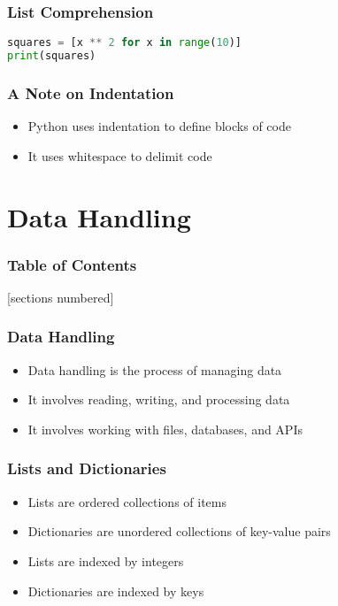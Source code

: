 \documentclass[serif, 9pt, aspectratio=32]{beamer}
\begin{document}
\begin{frame}[fragile]
    \frametitle{List Comprehension}
    \begin{lstlisting}[language=Python]
squares = [x ** 2 for x in range(10)]
print(squares)
    \end{lstlisting}
\end{frame}

\begin{frame}
    \centering
    \frametitle{A Note on Indentation}
    \begin{itemize}
        \setlength{\itemsep}{2em}
        \item Python uses indentation to define blocks of code
        \item It uses whitespace to delimit code
    \end{itemize}
\end{frame}

\section{Data Handling}

\begin{frame}
    \frametitle{Table of Contents}
    [sections numbered]
    \tableofcontents[currentsection]
\end{frame}

\begin{frame}
    \centering
    \frametitle{Data Handling}
    \begin{itemize}
        \setlength{\itemsep}{2em}
        \item Data handling is the process of managing data
        \item It involves reading, writing, and processing data
        \item It involves working with files, databases, and APIs
    \end{itemize}
\end{frame}

\begin{frame}
    \centering
    \frametitle{Lists and Dictionaries}
    \begin{itemize}
        \setlength{\itemsep}{2em}
        \item Lists are ordered collections of items
        \item Dictionaries are unordered collections of key-value pairs
        \item Lists are indexed by integers
        \item Dictionaries are indexed by keys
    \end{itemize}
\end{frame}
\end{document}
